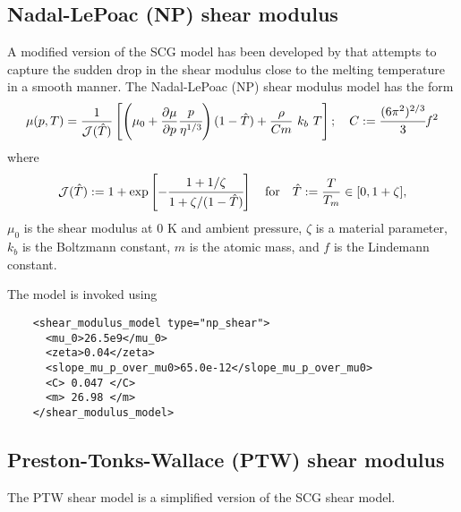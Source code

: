   \subsection{Nadal-LePoac (NP) shear modulus}
  A modified version of the SCG model has been developed by 
  \cite{Nadal2003} that attempts to capture the sudden drop in the
  shear modulus close to the melting temperature in a smooth manner.
  The Nadal-LePoac (NP) shear modulus model has the form
  \begin{equation} \label{eq:NPShear}
    \mu(p,T) = \frac{1}{\mathcal{J}(\hat{T})}
      \left[
        \left(\mu_0 + \frac{\displaystyle\partial \mu}{\displaystyle\partial p} \cfrac{p}{\eta^{1/3}} \right)
        (1 - \hat{T}) + \frac{\rho}{Cm}~k_b~T\right]; \quad
    C := \cfrac{(6\pi^2)^{2/3}}{3} f^2
  \end{equation}
  where
  \begin{equation}
    \mathcal{J}(\hat{T}) := 1 + \exp\left[-\cfrac{1+1/\zeta}
        {1+\zeta/(1-\hat{T})}\right] \quad
       \text{for} \quad \hat{T}:=\frac{T}{T_m}\in[0,1+\zeta],
  \end{equation}
  $\mu_0$ is the shear modulus at 0 K and ambient pressure, $\zeta$ is
  a material parameter, $k_b$ is the Boltzmann constant, $m$ is the atomic
  mass, and $f$ is the Lindemann constant.

  The model is invoked using
  \lstset{language=XML}
  \begin{lstlisting}
    <shear_modulus_model type="np_shear">
      <mu_0>26.5e9</mu_0>
      <zeta>0.04</zeta>
      <slope_mu_p_over_mu0>65.0e-12</slope_mu_p_over_mu0>
      <C> 0.047 </C>
      <m> 26.98 </m>
    </shear_modulus_model>
  \end{lstlisting}
  
  \subsection{Preston-Tonks-Wallace (PTW) shear modulus}
  The PTW shear model is a simplified version of the SCG shear model.

